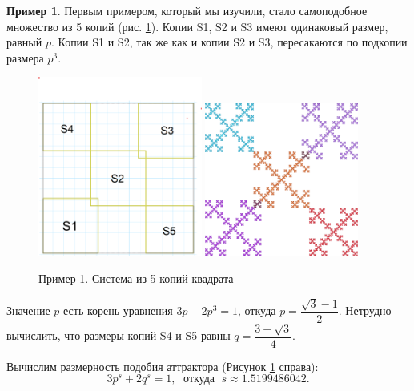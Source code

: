 \documentclass[a4paper,14pt]{extarticle} %
\newcommand{\0}{\varnothing}
\newcommand{\8}{\infty}
\theoremstyle{definition}
\newtheorem{example}{Пример}
\begin{document}
\begin{example}\label{ex:1}
Первым примером, который мы изучили, стало самоподобное множество из 5 копий (рис. \ref{fig:primer1_skelet}). 
Копии S1, S2 и S3 имеют одинаковый размер, равный $p$.
Копии S1 и S2, так же как и копии S2 и S3, пересакаются по подкопии размера $p^3$. 

\begin{figure}[H]
    \centering
    \includegraphics[width=0.48\textwidth]{3_2_скелет.png}
    \hfill
    \includegraphics[width=0.45\textwidth]{3_2.png}
    \caption{Пример 1. Система из 5 копий квадрата}
    \label{fig:primer1_skelet}
\end{figure}

Значение $p$ есть корень уравнения $3p-2p^3=1$, откуда $p=\dfrac{\sqrt{3}-1}{2}$. 
Нетрудно вычислить, что размеры копий S4 и S5 равны $q=\dfrac{3-\sqrt{3}}{4}$.

Вычислим размерность подобия аттрактора (Рисунок \ref{fig:primer1_skelet} справа):
$$3p^s+2q^s=1,\;\text{ откуда }\; s\approx1.5199486042.$$




\end{example}
\end{document}
